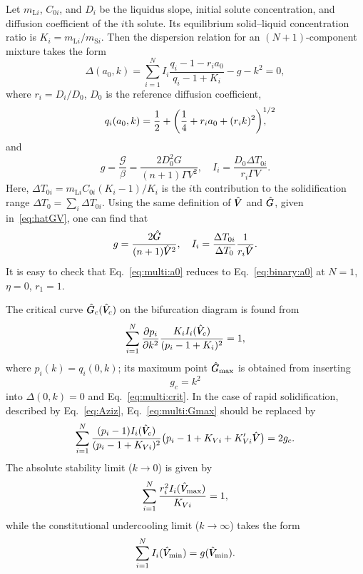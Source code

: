 \documentclass{article}
\newcommand{\liq}{\text{L}}
\newcommand{\sol}{\text{S}}
\newcommand{\hV}[1][\qty(\bar{V})]{\vphantom{#1}\mathrlap{\smash{\hat{V}}}V}
\newcommand{\hG}[1][\qty(\bar{G})]{\vphantom{#1}\mathrlap{\smash{\hat{G}}}G}
\begin{document}
Let $m_{\liq i}$, $C_{0i}$, and $D_i$ be the liquidus slope, initial solute concentration,
and diffusion coefficient of the $i$th solute.
Its equilibrium solid--liquid concentration ratio is $K_i = m_{\liq i}/m_{\sol i}$.
Then the dispersion relation for an $(N+1)$-component mixture takes the form
\begin{equation}\label{eq:multi:a0}
    \Delta(a_0,k) = \sum_{i=1}^N I_i\frac{q_i - 1 - r_ia_0}{q_i - 1 + K_i} - g - k^2 = 0,
\end{equation}
where $r_i = D_i/D_0$, $D_0$ is the reference diffusion coefficient,
\begin{equation}\label{eq:multi:q}
    q_i(a_0,k) = \frac12 + \qty(\frac14 + r_ia_0 + (r_ik)^2)^{\mathrlap{1/2}},
\end{equation}
and
\begin{equation}\label{eq:multi:gI}
    g = \frac{\mathcal{G}}{\beta} = \frac{2D_0^2G}{(n+1)\Gamma V^2}, \quad
    I_i = \frac{D_0\Delta{T}_{0i}}{r_i\Gamma V}.
\end{equation}
Here, $\Delta{T}_{0i} = m_{\liq i}C_{0i}(K_i-1)/K_i$ is the $i$th contribution to the solidification range
$\Delta{T}_0 = \sum_i \Delta{T}_{0i}$.
Using the same definition of $\hV$ and $\hG$, given in~\eqref{eq:hatGV}, one can find that
\begin{equation}\label{eq:multi:gI2}
    g = \frac{2\hG}{(n+1)\hV^2}, \quad I_i = \frac{\Delta{T}_{0i}}{\Delta{T}_0}\frac1{r_i\hV}.
\end{equation}
It is easy to check that Eq.~\eqref{eq:multi:a0} reduces to Eq.~\eqref{eq:binary:a0} at $N=1$, $\eta=0$, $r_1=1$.

The critical curve $\hG_c(\hV_c)$ on the bifurcation diagram is found from
\begin{equation}\label{eq:multi:crit}
    \sum_{i=1}^{N}\pdv{p_i}{k^2}\frac{K_iI_i(\hV_c)}{(p_i - 1 + K_i)^2} = 1,
\end{equation}
where $p_i(k) = q_i(0,k)$; its maximum point $\hG_\text{max}$ is obtained from inserting
\begin{equation}\label{eq:multi:Gmax}
    g_c = k^2
\end{equation}
into $\Delta(0,k)=0$ and Eq.~\eqref{eq:multi:crit}.
In the case of rapid solidification, described by Eq.~\eqref{eq:Aziz}, Eq.~\eqref{eq:multi:Gmax} should be replaced by
\begin{equation}\label{eq:multi:Gmax_rapid}
    \sum_{i=1}^{N}\frac{(p_i-1)I_i(\hV_c)}{(p_i - 1 + K_{Vi})^2}\qty(p_i-1+K_{Vi}+K_{Vi}'\hV) = 2g_c.
\end{equation}
The absolute stability limit ($k\to0$) is given by
\begin{equation}\label{eq:multi:absolute}
    \sum_{i=1}^{N}\frac{r_i^2I_i(\hV_\text{max})}{K_{Vi}} = 1,
\end{equation}
while the constitutional undercooling limit ($k\to\infty$) takes the form
\begin{equation}\label{eq:multi:constitutional}
    \sum_{i=1}^{N}I_i(\hV_\text{min}) = g(\hV_\text{min}).
\end{equation}
\end{document}
